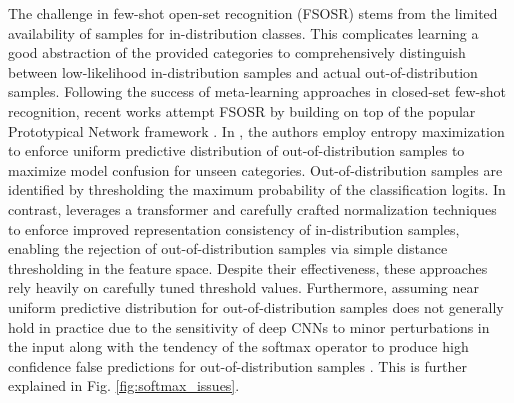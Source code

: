 The challenge in few-shot open-set recognition (FSOSR) stems from the limited availability of samples for in-distribution classes. This complicates learning a good abstraction of the provided categories to comprehensively distinguish between low-likelihood in-distribution samples and actual out-of-distribution samples. Following the success of meta-learning approaches \cite{maml,match_net,proto_net} in closed-set few-shot recognition, recent works \cite{peeler,snatcher} attempt FSOSR by building on top of the popular Prototypical Network framework \cite{proto_net}. In \cite{peeler}, the authors employ entropy maximization to enforce uniform predictive distribution of out-of-distribution samples to maximize model confusion for unseen categories. Out-of-distribution samples are identified by thresholding the maximum probability of the classification logits. In contrast, \cite{snatcher} leverages a transformer \cite{vaswani2017attention} and carefully crafted normalization techniques \cite{snatcher} to enforce improved representation consistency of in-distribution samples, enabling the rejection of out-of-distribution samples via simple distance thresholding in the feature space. Despite their effectiveness, these approaches rely heavily on carefully tuned threshold values. Furthermore, assuming near uniform predictive distribution for out-of-distribution samples does not generally hold in practice due to the sensitivity of deep CNNs to minor perturbations in the input \cite{goodfellow_adv} along with the tendency of the softmax operator to produce high confidence false predictions for out-of-distribution samples \cite{hendrycks17baseline}. This is further explained in Fig. \ref{fig:softmax_issues}.


